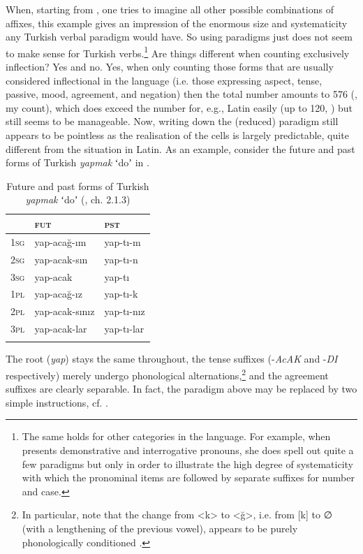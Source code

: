 \documentclass[output=paper]{langsci/langscibook}
\begin{document}
When, starting from , one tries to imagine all other possible combinations of affixes, this example gives an impression of the enormous size and systematicity any Turkish verbal paradigm would have. So using paradigms just does not seem to make sense for Turkish verbs.\footnote{The same holds for other categories in the language. For example, when \citet[311--320]{Kornfilt1997} presents demonstrative and interrogative pronouns, she does spell out quite a few paradigms but only in order to illustrate the high degree of systematicity with which the pronominal items are followed by separate suffixes for number and case.} Are things different when counting exclusively inflection? Yes and no. Yes, when only counting those forms that are usually considered inflectional in the language (i.e. those expressing aspect, tense, passive, mood, agreement, and negation) then the total number amounts to 576 (\citealt{Kornfilt1997}, my count), which does exceed the number for, e.g., Latin easily (up to 120, \citealt[396, my count]{Matthews1972}) but still seems to be manageable. Now, writing down the (reduced) paradigm still appears to be pointless as the realisation of the cells is largely predictable, quite different from the situation in Latin. As an example, consider the future and past forms of Turkish \textit{yapmak} ʻdoʼ in .\largerpage[-2]

\begin{table}
    \caption{Future and past forms of Turkish \textit{yapmak} ʻdoʼ (\citealt{Kornfilt1997}, ch. 2.1.3)\label{tab:reiner:2}}
\begin{tabular}{lll} 
\lsptoprule
               &   {\textsc{fut}}    & {\textsc{pst}}\\\midrule
{\textsc{1sg}} &  yap-acağ-ım &    yap-tı-m\\
{\textsc{2sg}} &  yap-acak-sın &   yap-tı-n\\
{\textsc{3sg}} &  yap-acak &          yap-tı\\
{\textsc{1pl}} &  yap-acağ-ız &    yap-tı-k\\
{\textsc{2pl}} &  yap-acak-sınız &    yap-tı-nız\\
{\textsc{3pl}} &  yap-acak-lar &      yap-tı-lar\\ 
\lspbottomrule
\end{tabular}
\end{table}


The root (\textit{yap}) stays the same throughout, the tense suffixes (-\textit{AcAK} and -\textit{DI} respectively) merely undergo phonological alternations,\footnote{In particular, note that the change from <k> to <ğ>, i.e. from [k] to \textrm{∅} (with a lengthening of the previous vowel), appears to be purely phonologically conditioned \citep[13–14, 91]{Ketrez2012}.} and the agreement suffixes are clearly separable. In fact, the paradigm above may be replaced by two simple instructions, cf. .
\end{document}
